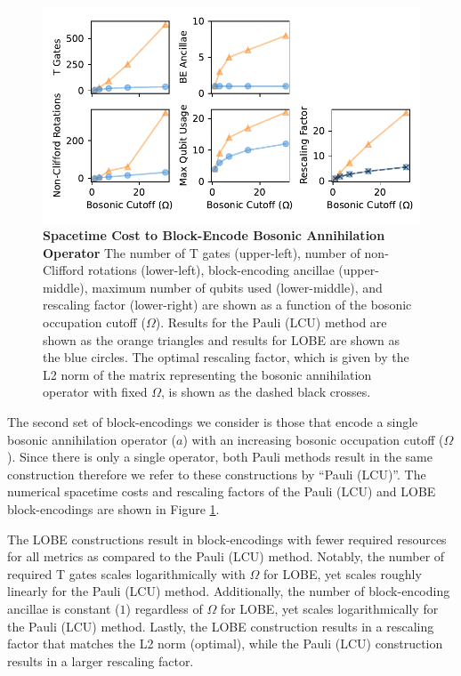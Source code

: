 \begin{figure}
    \centering
    \includegraphics[width=14cm]{figures/bosonic-comparison.pdf}
    \caption{
        \textbf{Spacetime Cost to Block-Encode Bosonic Annihilation Operator}
        The number of T gates (upper-left), number of non-Clifford rotations (lower-left), block-encoding ancillae (upper-middle), maximum number of qubits used (lower-middle), and rescaling factor (lower-right) are shown as a function of the bosonic occupation cutoff ($\Omega$).
        Results for the Pauli (LCU) method are shown as the orange triangles and results for LOBE are shown as the blue circles.
        The optimal rescaling factor, which is given by the L2 norm of the matrix representing the bosonic annihilation operator with fixed $\Omega$, is shown as the dashed black crosses. 
    }
    \label{fig:bosonic-comparison}
\end{figure}

The second set of block-encodings we consider is those that encode a single bosonic annihilation operator ($a$) with an increasing bosonic occupation cutoff ($\Omega$).
Since there is only a single operator, both Pauli methods result in the same construction therefore we refer to these constructions by ``Pauli (LCU)''.
The numerical spacetime costs and rescaling factors of the Pauli (LCU) and LOBE block-encodings are shown in Figure \ref{fig:bosonic-comparison}.

The LOBE constructions result in block-encodings with fewer required resources for all metrics as compared to the Pauli (LCU) method.
Notably, the number of required T gates scales logarithmically with $\Omega$ for LOBE, yet scales roughly linearly for the Pauli (LCU) method.
Additionally, the number of block-encoding ancillae is constant ($1$) regardless of $\Omega$ for LOBE, yet scales logarithmically for the Pauli (LCU) method.
Lastly, the LOBE construction results in a rescaling factor that matches the L2 norm (optimal), while the Pauli (LCU) construction results in a larger rescaling factor.

